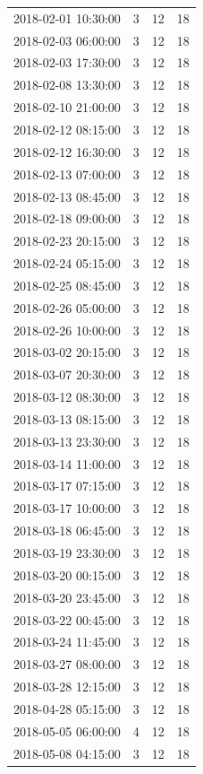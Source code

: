 \begin{tabular}{lrrr}
2018-02-01 10:30:00 & 3 & 12 & 18 \\
2018-02-03 06:00:00 & 3 & 12 & 18 \\
2018-02-03 17:30:00 & 3 & 12 & 18 \\
2018-02-08 13:30:00 & 3 & 12 & 18 \\
2018-02-10 21:00:00 & 3 & 12 & 18 \\
2018-02-12 08:15:00 & 3 & 12 & 18 \\
2018-02-12 16:30:00 & 3 & 12 & 18 \\
2018-02-13 07:00:00 & 3 & 12 & 18 \\
2018-02-13 08:45:00 & 3 & 12 & 18 \\
2018-02-18 09:00:00 & 3 & 12 & 18 \\
2018-02-23 20:15:00 & 3 & 12 & 18 \\
2018-02-24 05:15:00 & 3 & 12 & 18 \\
2018-02-25 08:45:00 & 3 & 12 & 18 \\
2018-02-26 05:00:00 & 3 & 12 & 18 \\
2018-02-26 10:00:00 & 3 & 12 & 18 \\
2018-03-02 20:15:00 & 3 & 12 & 18 \\
2018-03-07 20:30:00 & 3 & 12 & 18 \\
2018-03-12 08:30:00 & 3 & 12 & 18 \\
2018-03-13 08:15:00 & 3 & 12 & 18 \\
2018-03-13 23:30:00 & 3 & 12 & 18 \\
2018-03-14 11:00:00 & 3 & 12 & 18 \\
2018-03-17 07:15:00 & 3 & 12 & 18 \\
2018-03-17 10:00:00 & 3 & 12 & 18 \\
2018-03-18 06:45:00 & 3 & 12 & 18 \\
2018-03-19 23:30:00 & 3 & 12 & 18 \\
2018-03-20 00:15:00 & 3 & 12 & 18 \\
2018-03-20 23:45:00 & 3 & 12 & 18 \\
2018-03-22 00:45:00 & 3 & 12 & 18 \\
2018-03-24 11:45:00 & 3 & 12 & 18 \\
2018-03-27 08:00:00 & 3 & 12 & 18 \\
2018-03-28 12:15:00 & 3 & 12 & 18 \\
2018-04-28 05:15:00 & 3 & 12 & 18 \\
2018-05-05 06:00:00 & 4 & 12 & 18 \\
2018-05-08 04:15:00 & 3 & 12 & 18 \\

\end{tabular}
